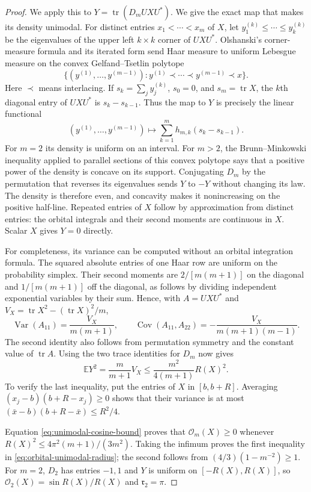 \begin{proof}
We apply this to $Y=\operatorname{tr}(D_mUXU^*)$.  We give the exact
map that makes its density unimodal.  For distinct entries
$x_1<\cdots<x_m$ of $X$, let $y^{(k)}_1\le\cdots\le y^{(k)}_k$ be the
eigenvalues of the upper left $k\times k$ corner of $UXU^*$.
Olshanski's corner-measure formula and its iterated form
\cite[Proposition 3.1 and Corollary 3.2, pp.~6--7]{olshanski2013}
send Haar measure to uniform Lebesgue measure on the convex
Gelfand--Tsetlin polytope
\[
 \{(y^{(1)},\ldots,y^{(m-1)}):
             y^{(1)}\prec\cdots\prec y^{(m-1)}\prec x\}.
\]
Here $\prec$ means interlacing.  If $s_k=\sum_jy^{(k)}_j$, $s_0=0$,
and $s_m=\operatorname{tr}X$, the $k$th diagonal entry of $UXU^*$ is
$s_k-s_{k-1}$.  Thus the map to $Y$ is precisely the linear functional
\[
 (y^{(1)},\ldots,y^{(m-1)})
       \longmapsto\sum_{k=1}^m h_{m,k}(s_k-s_{k-1}).
\]
For $m=2$ its density is uniform on an interval.  For $m>2$, the
Brunn--Minkowski inequality applied to parallel sections of this
convex polytope says that a positive power of the density is concave
on its support.  Conjugating $D_m$ by the permutation that reverses its
eigenvalues sends $Y$ to $-Y$ without changing its law.  The density is
therefore even, and concavity makes it nonincreasing on the positive
half-line.  Repeated entries of $X$ follow by approximation from
distinct entries: the orbital integrals and their second moments are
continuous in $X$.  Scalar $X$ gives $Y=0$ directly.

For completeness, its variance can be computed without an orbital
integration formula.  The squared absolute entries of one Haar row
are uniform on the probability simplex.  Their second moments are
$2/[m(m+1)]$ on the diagonal and $1/[m(m+1)]$ off the diagonal, as
follows by dividing independent exponential variables by their sum.
Hence, with $A=UXU^*$ and
$V_X=\operatorname{tr}X^2-(\operatorname{tr}X)^2/m$,
\[
 \operatorname{Var}(A_{11})=\frac{V_X}{m(m+1)},\qquad
 \operatorname{Cov}(A_{11},A_{22})
       =-\frac{V_X}{m(m+1)(m-1)}.
\]
The second identity also follows from permutation symmetry and the
constant value of $\operatorname{tr}A$.  Using the two trace identities
for $D_m$ now gives
\[
 \mathbb E Y^2=\frac{m}{m+1}V_X
                 \le\frac{m^2}{4(m+1)}R(X)^2.
\]
To verify the last inequality, put the entries of $X$ in $[b,b+R]$.
Averaging $(x_j-b)(b+R-x_j)\ge0$ shows that their variance is at most
$(\bar x-b)(b+R-\bar x)\le R^2/4$.

Equation \eqref{eq:unimodal-cosine-bound} proves that
$\mathcal O_m(X)\ge0$ whenever
$R(X)^2\le4\pi^2(m+1)/(3m^2)$.  Taking the infimum proves the first
inequality in \eqref{eq:orbital-unimodal-radius}; the second follows
from $(4/3)(1-m^{-2})\ge1$.  For $m=2$, $D_2$ has entries $-1,1$
and $Y$ is uniform on $[-R(X),R(X)]$, so
$\mathcal O_2(X)=\sin R(X)/R(X)$ and $\mathfrak r_2=\pi$.
\end{proof}

